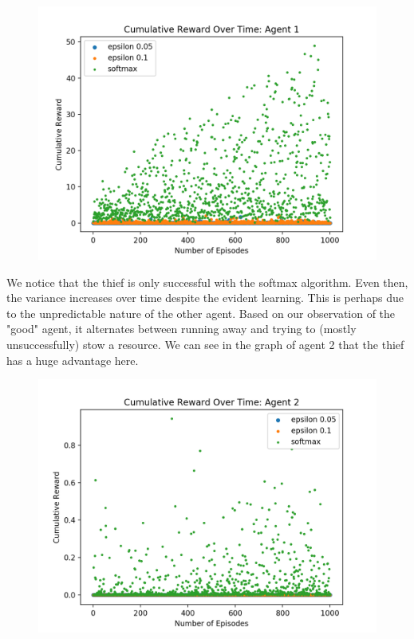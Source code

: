 \documentclass[11pt]{article}
\begin{document}

\begin{figure}[h]
  \centering
  \includegraphics[width=.7\textwidth]{thief-agent1}
\end{figure}



We notice that the thief is only successful with the softmax algorithm. Even then, the variance increases over time despite the evident learning. This is perhaps due to the unpredictable nature of the other agent. Based on our observation of the "good" agent, it alternates between running away and trying to (mostly unsuccessfully) stow a resource. We can see in the graph of agent 2 that the thief has a huge advantage here. 


\begin{figure}[h]
  \centering
  \includegraphics[width=.7\textwidth]{thief-agent2}
\end{figure}
\end{document}
